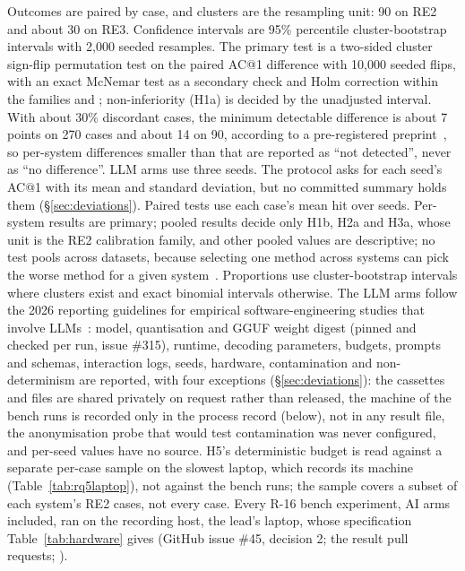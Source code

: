 Outcomes are paired by case, and clusters are the resampling unit: 90 on RE2 and about 30 on RE3.
Confidence intervals are 95\% percentile cluster-bootstrap intervals with 2,000 seeded resamples.
The primary test is a two-sided cluster sign-flip permutation test on the paired AC@1 difference with 10,000 seeded flips, with an exact McNemar test as a secondary check and Holm correction within the families  and ; non-inferiority (H1a) is decided by the unadjusted interval.
With about 30\% discordant cases, the minimum detectable difference is about 7 points on 270 cases and about 14 on 90, according to a pre-registered preprint~\cite{hussain2026prereg}, so per-system differences smaller than that are reported as ``not detected'', never as ``no difference''.
LLM arms use three seeds.
The protocol asks for each seed's AC@1 with its mean and standard deviation, but no committed summary holds them (\S\ref{sec:deviations}).
Paired tests use each case's mean hit over seeds.
Per-system results are primary; pooled results decide only H1b, H2a and H3a, whose unit is the RE2 calibration family, and other pooled values are descriptive; no test pools across datasets, because selecting one method across systems can pick the worse method for a given system~\cite{hu2026audit}.
Proportions use cluster-bootstrap intervals where clusters exist and exact binomial intervals otherwise.
The LLM arms follow the 2026 reporting guidelines for empirical software-engineering studies that involve LLMs~\cite{llmguidelines2026}: model, quantisation and GGUF weight digest (pinned and checked per run, issue \#315), runtime, decoding parameters, budgets, prompts and schemas, interaction logs, seeds, hardware, contamination and non-determinism are reported, with four exceptions (\S\ref{sec:deviations}): the cassettes and  files are shared privately on request rather than released, the machine of the bench runs is recorded only in the process record (below), not in any result file, the anonymisation probe that would test contamination was never configured, and per-seed values have no source.
H5's deterministic budget is read against a separate per-case sample on the slowest laptop, which records its machine (Table~\ref{tab:rq5laptop}), not against the bench runs; the sample covers a subset of each system's RE2 cases, not every case.
Every R-16 bench experiment, AI arms included, ran on the recording host, the lead's laptop, whose specification Table~\ref{tab:hardware} gives (GitHub issue \#45, decision 2; the result pull requests; ).
